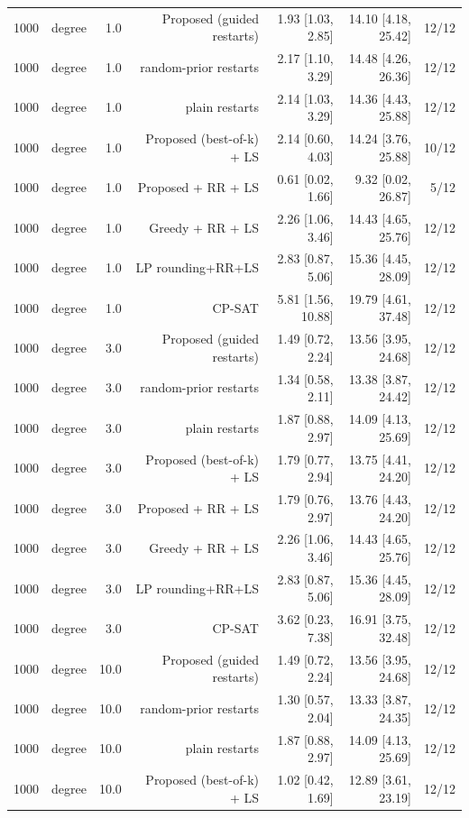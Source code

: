 \begin{table}[t]
\begin{tabular}{llrrrrr}
1000 & degree & 1.0 & Proposed (guided restarts) & 1.93 [1.03, 2.85] & 14.10 [4.18, 25.42] & 12/12 \\
1000 & degree & 1.0 & random-prior restarts & 2.17 [1.10, 3.29] & 14.48 [4.26, 26.36] & 12/12 \\
1000 & degree & 1.0 & plain restarts & 2.14 [1.03, 3.29] & 14.36 [4.43, 25.88] & 12/12 \\
1000 & degree & 1.0 & Proposed (best-of-k) + LS & 2.14 [0.60, 4.03] & 14.24 [3.76, 25.88] & 10/12 \\
1000 & degree & 1.0 & Proposed + RR + LS & 0.61 [0.02, 1.66] & 9.32 [0.02, 26.87] & 5/12 \\
1000 & degree & 1.0 & Greedy + RR + LS & 2.26 [1.06, 3.46] & 14.43 [4.65, 25.76] & 12/12 \\
1000 & degree & 1.0 & LP rounding+RR+LS & 2.83 [0.87, 5.06] & 15.36 [4.45, 28.09] & 12/12 \\
1000 & degree & 1.0 & CP-SAT & 5.81 [1.56, 10.88] & 19.79 [4.61, 37.48] & 12/12 \\
1000 & degree & 3.0 & Proposed (guided restarts) & 1.49 [0.72, 2.24] & 13.56 [3.95, 24.68] & 12/12 \\
1000 & degree & 3.0 & random-prior restarts & 1.34 [0.58, 2.11] & 13.38 [3.87, 24.42] & 12/12 \\
1000 & degree & 3.0 & plain restarts & 1.87 [0.88, 2.97] & 14.09 [4.13, 25.69] & 12/12 \\
1000 & degree & 3.0 & Proposed (best-of-k) + LS & 1.79 [0.77, 2.94] & 13.75 [4.41, 24.20] & 12/12 \\
1000 & degree & 3.0 & Proposed + RR + LS & 1.79 [0.76, 2.97] & 13.76 [4.43, 24.20] & 12/12 \\
1000 & degree & 3.0 & Greedy + RR + LS & 2.26 [1.06, 3.46] & 14.43 [4.65, 25.76] & 12/12 \\
1000 & degree & 3.0 & LP rounding+RR+LS & 2.83 [0.87, 5.06] & 15.36 [4.45, 28.09] & 12/12 \\
1000 & degree & 3.0 & CP-SAT & 3.62 [0.23, 7.38] & 16.91 [3.75, 32.48] & 12/12 \\
1000 & degree & 10.0 & Proposed (guided restarts) & 1.49 [0.72, 2.24] & 13.56 [3.95, 24.68] & 12/12 \\
1000 & degree & 10.0 & random-prior restarts & 1.30 [0.57, 2.04] & 13.33 [3.87, 24.35] & 12/12 \\
1000 & degree & 10.0 & plain restarts & 1.87 [0.88, 2.97] & 14.09 [4.13, 25.69] & 12/12 \\
1000 & degree & 10.0 & Proposed (best-of-k) + LS & 1.02 [0.42, 1.69] & 12.89 [3.61, 23.19] & 12/12 \\

\end{tabular}
\end{table}
